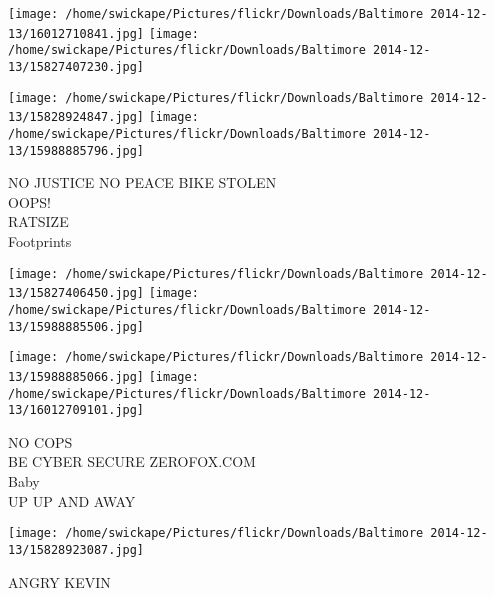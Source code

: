 \documentclass[10pt,letterpaper]{article}
\begin{document}
\texttt{[image: /home/swickape/Pictures/flickr/Downloads/Baltimore 2014-12-13/16012710841.jpg]}
\texttt{[image: /home/swickape/Pictures/flickr/Downloads/Baltimore 2014-12-13/15827407230.jpg]}

\texttt{[image: /home/swickape/Pictures/flickr/Downloads/Baltimore 2014-12-13/15828924847.jpg]}
\texttt{[image: /home/swickape/Pictures/flickr/Downloads/Baltimore 2014-12-13/15988885796.jpg]}

NO JUSTICE NO PEACE BIKE STOLEN\\
OOPS!\\
RATSIZE\\
Footprints\\
\pagebreak

\texttt{[image: /home/swickape/Pictures/flickr/Downloads/Baltimore 2014-12-13/15827406450.jpg]}
\texttt{[image: /home/swickape/Pictures/flickr/Downloads/Baltimore 2014-12-13/15988885506.jpg]}

\texttt{[image: /home/swickape/Pictures/flickr/Downloads/Baltimore 2014-12-13/15988885066.jpg]}
\texttt{[image: /home/swickape/Pictures/flickr/Downloads/Baltimore 2014-12-13/16012709101.jpg]}

NO COPS\\
BE CYBER SECURE ZEROFOX.COM\\
Baby\\
UP UP AND AWAY\\
\pagebreak

\texttt{[image: /home/swickape/Pictures/flickr/Downloads/Baltimore 2014-12-13/15828923087.jpg]}

ANGRY KEVIN\\
\pagebreak
\end{document}
